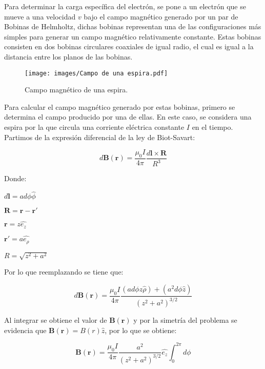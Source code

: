 Para determinar la carga específica del electrón, se pone a un electrón que se mueve a una velocidad $v$ bajo el campo magnético 
generado por un par de Bobinas de Helmholtz, dichas bobinas representan una de las configuraciones más
simples para generar un campo magnético relativamente constante. Estas bobinas consisten en dos bobinas circulares coaxiales de igual
radio, el cual es igual a la distancia entre los planos de las bobinas.



\begin{figure}[H]
    \centering
    \texttt{[image: images/Campo de una espira.pdf]}
    \caption{Campo magnético de una espira.}
    \label{fig:una_espira}
\end{figure}

Para calcular el campo magnético generado por estas bobinas, primero se determina el campo producido por una de ellas. En este caso, se considera una espira por la que circula una corriente eléctrica constante $I$ en el tiempo. Partimos de la expresión diferencial de la ley de Biot-Savart:

\begin{equation}\label{eq:Biot-Savart}
    d\mathbf{B}(\mathbf{r}) = \frac{\mu_0 I}{4 \pi} \frac{d\mathbf{l} \times \mathbf{R}}{R^{3}}
\end{equation}

Donde:

$d\mathbf{l}=a d\phi \hat{\phi}$ 

$\mathbf{R}=\mathbf{r}-\mathbf{r'}$ 

$\mathbf{r}=z\hat{e_{z}}$

$\mathbf{r'}=a\hat{e_{\rho}}$

$R=\sqrt{z^{2}+a^{2}}$ 

Por lo que reemplazando se tiene que:

\begin{equation} 
    d\mathbf{B}(\mathbf{r}) = \frac{\mu_{0}I}{4\pi} \frac{(a d\phi z \hat{\rho}) + (a^{2}d\phi \hat{z})}{(z^{2}+a^{2})^{3/2}}
\end{equation} 

Al integrar se obtiene el valor de $\mathbf{B}(\mathbf{r})$ y por la simetría del problema se evidencia que $\mathbf{B}(\mathbf{r}) = B(r)\hat{z}$, por lo que se obtiene:

\begin{equation} 
	\mathbf{B}(\mathbf{r}) = \frac{\mu_{0}I}{4 \pi} \frac{a^{2}}{(z^{2}+a^{2})^{3/2}} \hat{e_{z}} \int _{0}^{2 \pi} d\phi
\end{equation}

